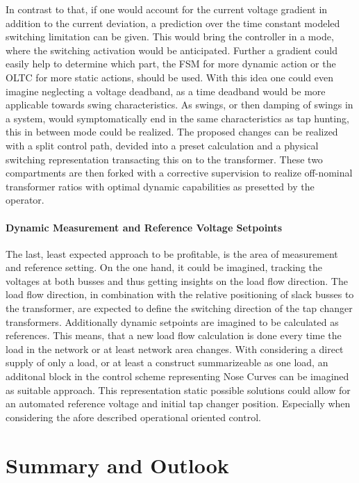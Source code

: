 In contrast to that, if one would account for the current voltage gradient in addition to the current deviation, a prediction over the time constant modeled switching limitation can be given.
This would bring the controller in a mode, where the switching activation would be anticipated.
Further a gradient could easily help to determine which part, the \acs{FSM} for more dynamic action or the \acs{OLTC} for more static actions, should be used.
With this idea one could even imagine neglecting a voltage deadband, as a time deadband would be more applicable towards swing characteristics. 
As swings, or then damping of swings in a system, would symptomatically end in the same characteristics as tap hunting, this in between mode could be realized.
The proposed changes can be realized with a split control path, devided into a preset calculation and a physical switching representation transacting this on to the transformer. 
These two compartments are then forked with a corrective supervision to realize off-nominal transformer ratios with optimal dynamic capabilities as presetted by the operator.

\subsubsection{Dynamic Measurement and Reference Voltage Setpoints}

The last, least expected approach to be profitable, is the area of measurement and reference setting.
On the one hand, it could be imagined, tracking the voltages at both busses and thus getting insights on the load flow direction.
The load flow direction, in combination with the relative positioning of slack busses to the transformer, are expected to define the switching direction of the tap changer transformers.
Additionally dynamic setpoints are imagined to be calculated as references.
This means, that a new load flow calculation is done every time the load in the network or at least network area changes.
With considering a direct supply of only a load, or at least a construct summarizeable as one load, an additonal block in the control scheme representing Nose Curves can be imagined as suitable approach.
This representation static possible solutions could allow for an automated reference voltage and initial tap changer position.
Especially when considering the afore described operational oriented control.

\chapter{Summary and Outlook}
\label{chap:summary}

